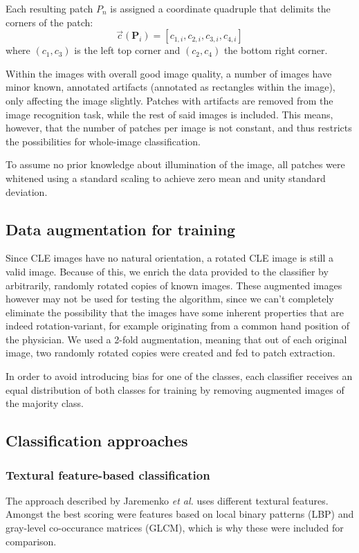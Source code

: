 \documentclass[fleqn,10pt]{wlscirep}
\begin{document}
Each resulting patch $P_n$ is assigned a coordinate quadruple
that delimits the corners of the patch:
\begin{equation}
\vec{c}(\textbf{P}_i)  = \left[ c_{1,i}, c_{2,i}, c_{3,i}, c_{4,i}\right]
\end{equation}
where $(c_1,c_3)$ is the left top corner and $(c_2,c_4)$ the bottom right corner.

Within the images with overall good image quality, a number of images have minor known, annotated
artifacts (annotated as rectangles within the image), only affecting the image slightly. Patches with artifacts are removed from the image
recognition task, while the rest of said images is included. This means, however, that the number of patches per
image is not constant, and thus restricts the possibilities for
whole-image classification.


To assume no prior knowledge about illumination of the image, all
patches were whitened using a standard scaling to achieve zero mean and
unity standard deviation. 

\subsection{Data augmentation for training}
Since CLE images have no natural orientation, a rotated CLE image is
still a valid image. Because of this, we enrich the data provided to
the classifier by arbitrarily, randomly rotated copies of known images. These
augmented images however may not be used for testing the algorithm,
since we can't completely eliminate the possibility that the images
have some inherent properties that are indeed rotation-variant, for
example originating from a common hand position of the physician.  We
used a 2-fold augmentation, meaning that out of each original image, two randomly rotated
 copies were created and fed to patch extraction. 

In order to avoid introducing bias for one of the classes, each classifier receives an equal
distribution of both classes for training by removing augmented images of the majority class. 

\subsection{Classification approaches}
\vspace{0.5em}
\subsubsection{Textural feature-based classification}
The approach described by Jaremenko \textit{et al.}\cite{Jaremenko:2015kh} uses
different textural features. Amongst the best scoring were features
based on local binary
patterns (LBP) and gray-level co-occurance matrices (GLCM), which is why these were
included for comparison. 
\end{document}
